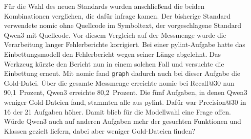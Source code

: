 Für die Wahl des neuen Standards wurden anschließend die beiden Kombinationen verglichen, die dafür infrage kamen. Der bisherige Standard verwendete nomic ohne Quellcode im Symboltext, der vorgeschlagene Standard Qwen3 mit Quellcode. Vor diesem Vergleich auf der Messmenge wurde die Verarbeitung langer Fehlerberichte korrigiert. Bei einer pylint-Aufgabe hatte das Einbettungsmodell den Fehlerbericht wegen seiner Länge abgelehnt. Das Werkzeug kürzte den Bericht nun in einem solchen Fall und versuchte die Einbettung erneut. Mit nomic fand \texttt{graph} dadurch auch bei dieser Aufgabe die Gold-Datei. Über die gesamte Messmenge erreichte nomic bei Recall@30 nun 90,1~Prozent, Qwen3 erreichte 80,2~Prozent.
Die fünf Aufgaben, in denen Qwen3 weniger Gold-Dateien fand, stammten alle aus pylint. Dafür war Precision@30 in 16 der 21 Aufgaben höher.
Damit blieb für die Modellwahl eine Frage offen. Würde Qwen3 auch auf anderen Aufgaben mehr der gesuchten Funktionen und Klassen gezielt liefern, dabei aber weniger Gold-Dateien finden?

